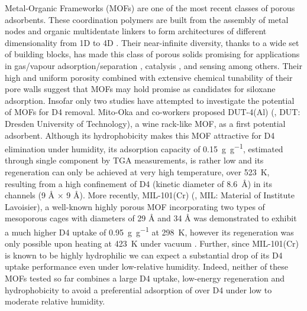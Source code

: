Metal-Organic Frameworks (MOFs) are one of the most recent classes of porous
adsorbents. These coordination polymers are built from the assembly of metal
nodes and organic multidentate linkers to form architectures of different
dimensionality from 1D to 4D \citep{fereyHybridPorousSolids2008,
zhouIntroductionMetalOrganic2012,
evansFourdimensionalMetalorganicFrameworks2020}. Their near-infinite diversity,
thanks to a wide set of building blocks, has made this class of porous solids
promising for applications in gas/vapour adsorption/separation
\citep{siegelmanChallengesOpportunitiesAdsorptionbased2019,
linMicroporousMetalOrganicFramework2020}, catalysis
\citep{bavykinaMetalOrganicFrameworks2020}, and sensing
\citep{allendorfElectronicDevicesUsing2020,
woellnerAdsorptionDetectionHazardous2018} among others. Their high and uniform
porosity combined with extensive chemical tunability of their pore walls suggest
that MOFs may hold promise as candidates for siloxane adsorption. Insofar only
two studies have attempted to investigate the potential of MOFs for D4 removal.
Mito-Oka and co-workers \citep{mito-okaSiloxaneD4Capture2013} proposed DUT-4(Al)
(\ce{[Al(OH)(2,6-ndc)}, DUT: Dresden University of Technology), a wine rack-like
MOF, as a first potential adsorbent. Although its hydrophobicity makes this MOF
attractive for D4 elimination under humidity, its adsorption capacity of
\SI{0.15}{\gram\per\gram}, estimated through single component by TGA
measurements, is rather low and its regeneration can only be achieved at very
high temperature, over \SI{523}{\kelvin}, resulting from a high confinement of
D4 (kinetic diameter of \SI{8.6}{\angstrom}) in its channels (9 Å × 9 Å). More
recently, MIL-101(Cr) (, MIL: Material of Institute
Lavoisier), a well-known highly porous MOF incorporating two types of mesoporous
cages with diameters of 29 Å and 34 Å was demonstrated to exhibit a much higher
D4 uptake of \SI{0.95}{\gram\per\gram} at \SI{298}{\kelvin}, however its
regeneration was only possible upon heating at \SI{423}{\kelvin} under vacuum
\citep{gargiuloChromiumbasedMIL101Metal2019}. Further, since MIL-101(Cr) is
known to be highly hydrophilic \citep{zhaoSynthesisMIL101Cr2020} we can expect a
substantial drop of its D4 uptake performance even under low-relative humidity.
Indeed, neither of these MOFs tested so far combines a large D4 uptake,
low-energy regeneration and hydrophobicity to avoid a preferential adsorption of
 over D4 under low to moderate relative humidity.

